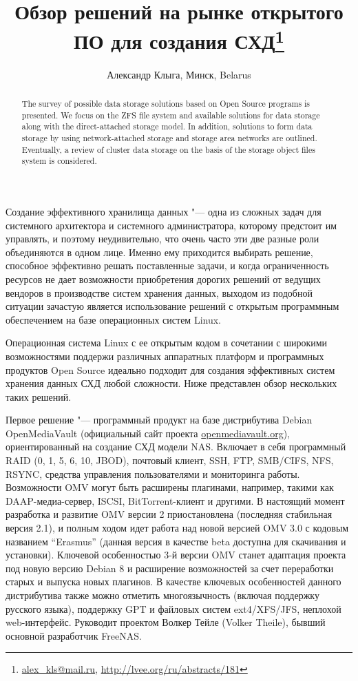 \documentclass[10pt, a5paper]{article}
\begin{document}
\title{Обзор решений на рынке открытого ПО для создания СХД\footnote{\url{alex_kls@mail.ru}, \url{http://lvee.org/ru/abstracts/181}}}
\author{Александр Клыга, Минск, Belarus}
\maketitle
\begin{abstract}
The survey of possible data storage solutions based on Open Source programs is presented. We focus on the ZFS file system and available solutions for data storage along with the direct-attached storage model. In addition, solutions to form data stora\-ge by using network-attached storage and storage area networks are outlined. Eventually, a review of  cluster data storage on the basis of the storage object files system is considered.
\end{abstract}
Создание эффективного хранилища данных "--- одна из сложных задач для системного архитектора и системного администратора, которому предстоит им управлять, и поэтому неудивительно, что очень часто эти две разные роли объединяются в одном лице. Именно ему приходится выбирать решение, способное эффективно решать поставленные задачи, и когда ограниченность ресурсов не дает возможности приобретения дорогих решений от ведущих вендоров в производстве систем хранения данных, выходом из подобной ситуации зачастую является использование решений с открытым программным обеспечением на базе операционных систем Linux.

Операционная система Linux с ее открытым кодом в сочетании с широкими возможностями поддержи различных аппаратных платформ и программных продуктов Open Source идеально подходит для создания эффективных систем хранения данных СХД любой сложности. Ниже представлен обзор нескольких таких решений.

Первое решение "--- программный продукт на базе дистрибутива Debian OpenMediaVault (официальный сайт проекта \url{openmediavault.org}), ориентированный на создание СХД модели NAS. Включает в себя программный RAID (0, 1, 5, 6, 10, JBOD), почтовый клиент, SSH, FTP, SMB/CIFS, NFS, RSYNC, средства управления пользователями и  мониторинга работы. Возможности OMV могут быть расширены плагинами, например, такими как DAAP-медиа-сервер, ISCSI, BitTorrent-клиент и другими. В настоящий момент разработка и развитие OMV версии 2 приостановлена (последняя стабильная версия 2.1), и  полным ходом идет  работа над новой версией OMV 3.0 с кодовым названием ``Erasmus'' (данная версия в качестве beta доступна для скачивания и установки). Ключевой особенностью 3-й версии OMV станет адаптация проекта под новую версию Debian 8 и расширение возможностей за счет переработки старых и выпуска новых плагинов. В качестве ключевых особенностей данного дистрибутива также можно отметить многоязычность (включая поддержку русского языка), поддержку GPT и файловых систем ext4/XFS/JFS, неплохой web-интерфейс. Руководит проектом Волкер Тейле (Volker Theile), бывший основной разработчик FreeNAS.
\end{document}

